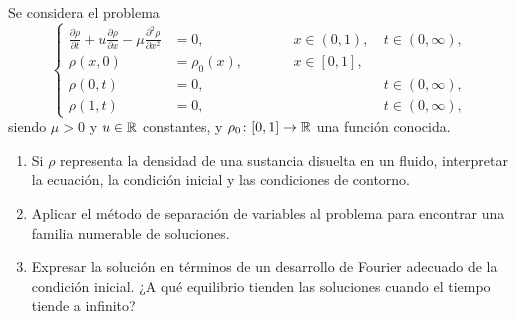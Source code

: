 \documentclass[11pt]{report}
\begin{document}
\begin{exercise}[Junio de 2022]
    Se considera el problema
    \[\left\{\begin{alignedat}{4}
        \frac{\partial \rho}{\partial t}+u\frac{\partial \rho}{\partial x}-\mu\frac{\partial^2\rho}{\partial x^2} &= 0, & \qquad & x \in (0,1), \ & t \in (0,\infty), \\
        \rho(x,0) &= \rho_0(x), & \qquad & x \in [0,1], & \\
        \rho(0,t) &= 0, & \qquad & \ & t \in (0,\infty), \\
        \rho(1,t) &= 0, & \qquad & \ & t \in (0,\infty),
    \end{alignedat}\right.\]
    siendo $\mu > 0$ y $u \in \mathbb R$ constantes, y $\rho_0\colon[0,1]\to\mathbb R$ una función conocida.
    \begin{enumerate}
        \item Si $\rho$ representa la densidad de una sustancia disuelta en un fluido, interpretar la ecuación, la condición inicial y las condiciones de contorno.
        \item Aplicar el método de separación de variables al problema para encontrar una familia numerable de soluciones.
        \item Expresar la solución en términos de un desarrollo de Fourier adecuado de la condición inicial. ¿A qué equilibrio tienden las soluciones cuando el tiempo tiende a infinito?
    \end{enumerate}
\end{exercise}
\end{document}

